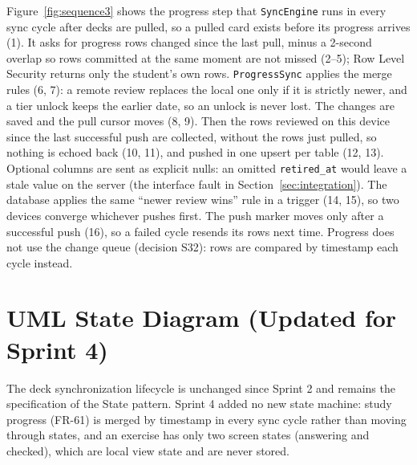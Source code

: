 \documentclass[12pt,letterpaper]{article}
\begin{document}
Figure~\ref{fig:sequence3} shows the progress step that \texttt{SyncEngine} runs in
every sync cycle after decks are pulled, so a pulled card exists before its progress
arrives (1). It asks for progress rows changed since the last pull, minus a 2-second
overlap so rows committed at the same moment are not missed (2--5); Row Level Security returns only the
student's own rows. \texttt{ProgressSync} applies the merge rules (6, 7): a remote
review replaces the local one only if it is strictly newer, and a tier unlock keeps
the earlier date, so an unlock is never lost. The changes are saved and the pull cursor
moves (8, 9). Then the rows reviewed on this device since the last successful push
are collected, without the rows just pulled, so nothing is echoed back (10, 11), and
pushed in one upsert per table (12, 13). Optional columns are sent as explicit nulls:
an omitted \texttt{retired\_at} would leave a stale value on the server (the interface
fault in Section~\ref{sec:integration}). The database applies the same ``newer review
wins'' rule in a trigger (14, 15), so two devices converge whichever pushes first.
The push marker moves only after a successful push (16), so a failed cycle resends
its rows next time. Progress does not use the change queue (decision S32): rows are
compared by timestamp each cycle instead.

\section{UML State Diagram (Updated for Sprint 4)}
The deck synchronization lifecycle is unchanged since Sprint 2 and remains the
specification of the State pattern. Sprint 4 added no new state machine: study progress
(FR-61) is merged by timestamp in every sync cycle rather than moving through states,
and an exercise has only two screen states (answering and checked), which are local
view state and are never stored.
\end{document}
